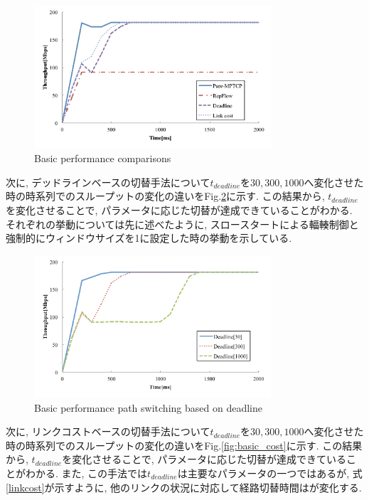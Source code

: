\begin{figure}[t]
    \begin{center}
    \includegraphics[autoebb, width=250pt]{./img/basic_comp.pdf}
    \caption{Basic performance comparisons}
    \label{fig:basic_comparison}
    \end{center}
\end{figure}

次に,
デッドラインベースの切替手法について$t_{deadline}$を$30,
300, 1000$へ変化させた時の時系列でのスループットの変化の違いをFig.\ref{fig:basic_deadline}に示す.
この結果から, $t_{deadline}$を変化させることで, パラメータに応じた切替が達成できていることがわかる. 
それぞれの挙動については先に述べたように, スロースタートによる輻輳制御と強制的にウィンドウサイズを1に設定した時の挙動を示している. 

\begin{figure}[t]
    \begin{center}
    \includegraphics[autoebb, width=250pt]{./img/basic_dead.pdf}
    \caption{Basic performance path switching based on deadline}
    \label{fig:basic_deadline}
    \end{center}
\end{figure}


次に,
リンクコストベースの切替手法について$t_{deadline}$を$30,
300, 1000$へ変化させた時の時系列でのスループットの変化の違いをFig.\ref{fig:basic_cost}に示す.
この結果から, $t_{deadline}$を変化させることで, パラメータに応じた切替が達成できていることがわかる. 
また, この手法では$t_{deadline}$は主要なパラメータの一つではあるが, 式\ref{linkcost}が示すように,
他のリンクの状況に対応して経路切替時間はが変化する. 


